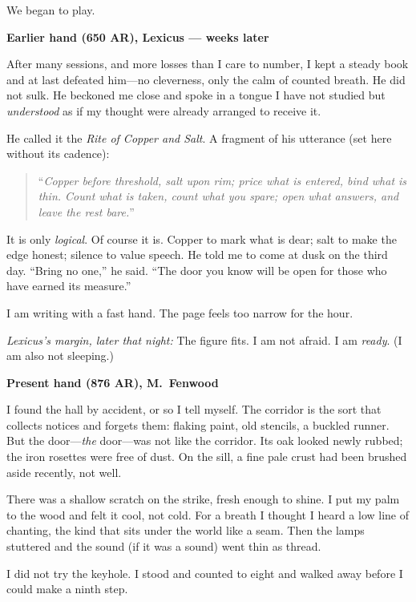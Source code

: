 \documentclass[11pt]{article}
\begin{document}
We began to play.

\medskip
\noindent\textbf{Earlier hand (650 AR), Lexicus — weeks later}

After many sessions, and more losses than I care to number, I kept a steady book and at last defeated him—no cleverness, only the calm of counted breath. He did not sulk. He beckoned me close and spoke in a tongue I have not studied but \emph{understood} as if my thought were already arranged to receive it.

He called it the \textit{Rite of Copper and Salt}. A fragment of his utterance (set here without its cadence):

\begin{quote}\small
“\textit{Copper before threshold, salt upon rim; price what is entered, bind what is thin. Count what is taken, count what you spare; open what answers, and leave the rest bare.}”
\end{quote}

It is only \emph{logical}. Of course it is. Copper to mark what is dear; salt to make the edge honest; silence to value speech. He told me to come at dusk on the third day. “Bring no one,” he said. “The door you know will be open for those who have earned its measure.”

I am writing with a fast hand. The page feels too narrow for the hour.

\medskip
\noindent\textit{Lexicus’s margin, later that night:} The figure fits. I am not afraid. I am \emph{ready}. (I am also not sleeping.)

\medskip
\noindent\textbf{Present hand (876 AR), M.\ Fenwood}

I found the hall by accident, or so I tell myself. The corridor is the sort that collects notices and forgets them: flaking paint, old stencils, a buckled runner. But the door—\emph{the} door—was not like the corridor. Its oak looked newly rubbed; the iron rosettes were free of dust. On the sill, a fine pale crust had been brushed aside recently, not well.

There was a shallow scratch on the strike, fresh enough to shine. I put my palm to the wood and felt it cool, not cold. For a breath I thought I heard a low line of chanting, the kind that sits under the world like a seam. Then the lamps stuttered and the sound (if it was a sound) went thin as thread.

I did not try the keyhole. I stood and counted to eight and walked away before I could make a ninth step.
\end{document}
